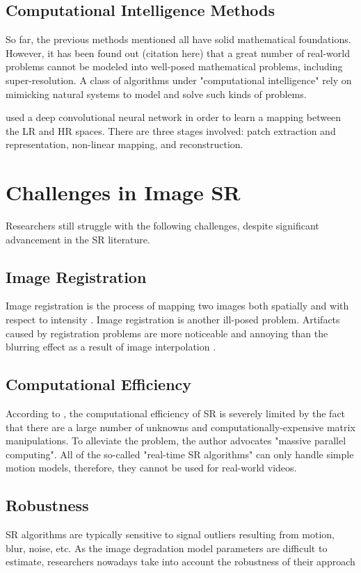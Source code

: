 \subsection{Computational Intelligence Methods}
So far, the previous methods mentioned all have solid mathematical foundations.
However, it has been found out (citation here) that a great number of real-world problems cannot be modeled into well-posed mathematical problems, including super-resolution.
A class of algorithms under "computational intelligence" rely on mimicking natural systems to model and solve such kinds of problems.

\cite{Dong2014} used a deep convolutional neural network in order to learn a mapping between the LR and HR spaces. 
There are three stages involved: patch extraction and representation, non-linear mapping, and reconstruction.


\section{Challenges in Image SR}
Researchers still struggle with the following challenges, despite significant advancement in the SR literature.


\subsection{Image Registration}
Image registration is the process of mapping two images both spatially and with respect to intensity \citep{Brown1992}.
Image registration is another ill-posed problem.
Artifacts caused by registration problems are more noticeable and annoying than the blurring effect as a result of image interpolation \citep{Yang2010a}.
\subsection{Computational Efficiency}
According to \cite{Yang2010a}, the computational efficiency of SR is severely limited by the fact that there are a large number of unknowns and computationally-expensive matrix manipulations. 
To alleviate the problem, the author advocates "massive parallel computing".
All of the so-called "real-time SR algorithms" can only handle simple motion models, therefore, they cannot be used for real-world videos.

\subsection{Robustness}
SR algorithms are typically sensitive to signal outliers resulting from motion, blur, noise, etc. 
As the image degradation model parameters are difficult to estimate, researchers nowadays take into account the robustness of their approach \citep{Yang2010a}

